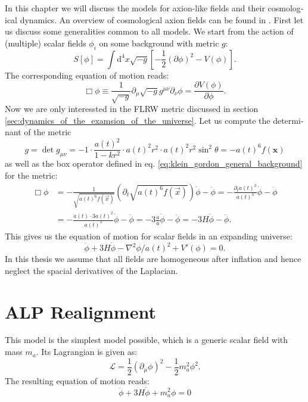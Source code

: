 \documentclass[master,       %
               twoside,        %
               BCOR10mm,       %
               english,ngerman, %
               ]{GAUBM}
\begin{document}
\begin{otherlanguage}{english}
In this chapter we will discuss the models for axion-like fields and their cosmological dynamics.
An overview of cosmological axion fields can be found in \cite{MarshAxionCosmo}.
First let us discuss some generalities common to all models.
We start from the action of (multiple) scalar fields $\phi_i$ on some background with metric $g$:
\begin{equation}
	S[\phi] = \int \mathrm{d}^4 x \sqrt{-g} \left[- \frac{1}{2} (\partial \phi)^2 - V(\phi) \right].
\end{equation}
The corresponding equation of motion reads:
\begin{equation}
	\label{eq:klein_gordon_general_background}
	\Box \phi \equiv \frac{1}{\sqrt{-g}} \partial_\mu \sqrt{-g} g^{\mu \nu} \partial_\nu \phi = \frac{\partial V(\phi)}{\partial \phi}.
\end{equation}
Now we are only interessted in the FLRW metric discussed in section \ref{sec:dynamics_of_the_examsion_of_the_universe}.
Let us compute the determinant of the metric
\begin{equation}
	g = \det g_{\mu \nu} = -1 \cdot \frac{a(t)^2}{1 - kr^2} \cdot a(t)^2 r^2 \cdot a(t)^2 r^2 \sin^2 \theta = - a(t)^6 f(\mathbf{x})
\end{equation}
as well as the box operator defined in eq. \eqref{eq:klein_gordon_general_background} for the metric:
\begin{align}
	    \Box \phi
	    &= - \frac{1}{\sqrt{a(t)^6 f(\vec{x})}} (\partial_t \sqrt{ a(t)^6 f(\vec{x}) }) \dot{\phi} - \ddot{\phi}
	    = - \frac{\partial_t a(t)^3}{a(t)^3} \dot{\phi} - \ddot{\phi} \nonumber \\
	    &= - \frac{\dot{a}(t) \cdot 3 a(t)^2}{a(t)^3} \dot{\phi} - \ddot{\phi}
	    = - 3 \frac{\dot{a}}{a} \dot{\phi} - \ddot{\phi}
	    = - 3H \dot{\phi} - \ddot{\phi}.
\end{align}
This gives us the equation of motion for scalar fields in an expanding universe:
\begin{equation}
	\ddot{\phi} + 3 H \dot{\phi} - \nabla^2 \phi / a(t)^2 + V'(\phi) = 0.
\end{equation}
In this thesis we assume that all fields are homogeneous after inflation and hence neglect the spacial derivatives of the Laplacian.

\section{ALP Realignment}
This model is the simplest model possible, which is a generic scalar field with mass $m_a$. Its Lagrangian is given as:
\begin{equation}
	\mathcal{L} = \frac{1}{2} \left( \partial_\mu \phi \right)^2 - \frac{1}{2} m_a^2 \phi^2.
	\label{eq:L_alp}
\end{equation}
The resulting equation of motion reads:
\begin{equation}
	\ddot{\phi} + 3 H \dot{\phi} + m_a^2 \phi = 0
\end{equation}


\end{otherlanguage}
\end{document}
